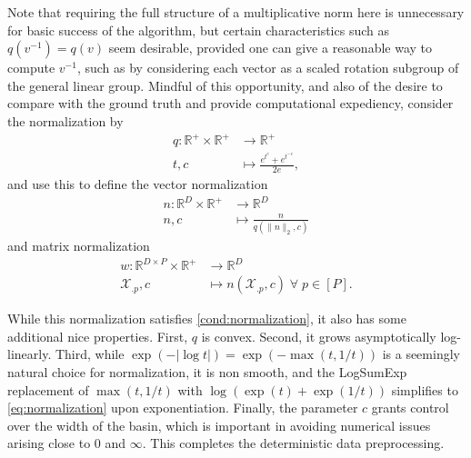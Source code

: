 Note that requiring the full structure of a multiplicative norm here is unnecessary for basic success of the algorithm, but certain characteristics such as $q(v^{-1}) = q(v)$ seem desirable, provided one can give a reasonable way to compute $v^{-1}$, such as by considering each vector as a scaled rotation subgroup of the general linear group.
Mindful of this opportunity, and also of the desire to compare with the ground truth and provide computational expediency, consider the normalization by
\begin{align}
\label{eq:normalization}
q: \mathbb R^+ \times \mathbb R^+  &\to \mathbb R^+ \\
t , c &\mapsto \frac{e^{t^c} + e^{t^{-c}}}{2e},
\end{align}
and use this to define the vector normalization 
\begin{align}
n: \mathbb R^D \times \mathbb R^+ &\to \mathbb R^D \\
n , c &\mapsto \frac{n}{q(\|n\|_{2},c) }
\end{align}
and matrix normalization
\begin{align}
w: \mathbb R^{D \times P} \times \mathbb R^+ &\to \mathbb R^D \\
\mathcal X_{.p} , c &\mapsto n(\mathcal X_{.p}, c) \; \forall \; p \in [P].
\end{align}

While this normalization satisfies \ref{cond:normalization}, it also has some additional nice properties.
First, $q$ is convex.
Second, it grows asymptotically log-linearly.
Third, while $\exp(-|\log t|) = \exp(-\max (t, 1/t))$ is a seemingly natural choice for normalization, it is non smooth, and the LogSumExp replacement of $\max (t, 1/t)$ with $ \log (\exp (t ) + \exp(1/t))$ simplifies to \ref{eq:normalization} upon exponentiation.
Finally, the parameter $c$ grants control over the width of the basin, which is important in avoiding numerical issues arising close to $0$ and $\infty$.
This completes the deterministic data preprocessing.

